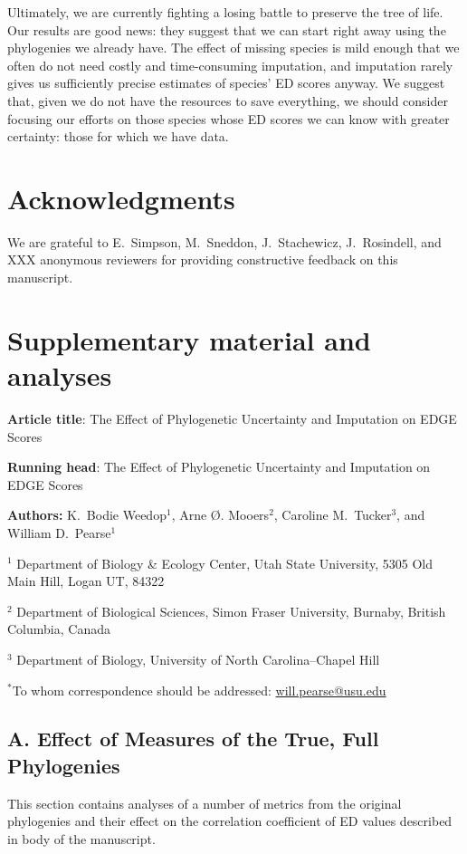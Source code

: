 \documentclass[10pt,english]{article}
\begin{document}
Ultimately, we are currently fighting a losing battle to preserve the tree of
life. Our results are good news: they suggest that we can start right away using
the phylogenies we already have. The effect of missing species is mild
enough that we often do not need costly and time-consuming imputation, and
imputation rarely gives us sufficiently precise estimates of species' ED scores
anyway. We suggest that, given we do not have the resources to save everything,
we should consider focusing our efforts on those species whose ED scores we can
know with greater certainty: those for which we have data.

\section*{Acknowledgments}
We are grateful to E.\ Simpson, M.\ Sneddon, J.\ Stachewicz, J.\ Rosindell, and XXX
anonymous reviewers for providing constructive feedback on this
manuscript.

\clearpage
\printbibliography

\clearpage
\appendix 
\section*{Supplementary material and analyses}
\textbf{Article title}: The Effect of Phylogenetic Uncertainty and Imputation on EDGE Scores

\textbf{Running head}: The Effect of Phylogenetic Uncertainty and Imputation on EDGE Scores

\textbf{Authors:} K.\ Bodie Weedop$^{1}$, Arne \O. Mooers$^2$, Caroline M.\ Tucker$^3$, and William D.\ Pearse$^{1}$\

$^1$ Department of Biology \& Ecology Center, Utah State University,
5305 Old Main Hill, Logan UT, 84322

$^2$ Department of Biological Sciences, Simon Fraser University, Burnaby,
British Columbia, Canada

$^3$ Department of Biology, University of North Carolina–Chapel Hill

$^*$To whom correspondence should be addressed:
\url{will.pearse@usu.edu}
\clearpage
\subsection*{A. Effect of Measures of the True, Full Phylogenies}

This section contains analyses of a number of metrics from the original
phylogenies and their effect on the correlation coefficient of ED values
described in body of the manuscript.
\end{document}
